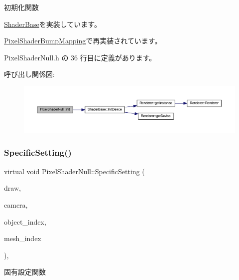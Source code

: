 初期化関数 



\mbox{\hyperlink{class_shader_base_a9622b2f5e0184a78d3af82820dc5113d}{Shader\+Base}}を実装しています。



\mbox{\hyperlink{class_pixel_shader_bump_mapping_ab7807b7c56242e965ddb23e66e1a5d9e}{Pixel\+Shader\+Bump\+Mapping}}で再実装されています。



 Pixel\+Shader\+Null.\+h の 36 行目に定義があります。

呼び出し関係図\+:
\nopagebreak
\begin{figure}[H]
\begin{center}
\leavevmode
\includegraphics[width=350pt]{class_pixel_shader_null_abfd7a6a986da09061a55d31024219eba_cgraph}
\end{center}
\end{figure}
\mbox{\label{class_pixel_shader_null_a8dd0194b5a22da5261ab35233a7cfdcd}} 
\subsubsection{\texorpdfstring{Specific\+Setting()}{SpecificSetting()}}
{\footnotesize\ttfamily virtual void Pixel\+Shader\+Null\+::\+Specific\+Setting (\begin{DoxyParamCaption}\item[{\mbox{\hyperlink{class_draw_base}{Draw\+Base}} $\ast$}]{draw,  }\item[{\mbox{\hyperlink{class_camera}{Camera}} $\ast$}]{camera,  }\item[{unsigned}]{object\+\_\+index,  }\item[{unsigned}]{mesh\+\_\+index }\end{DoxyParamCaption})\hspace{0.3cm}{\ttfamily [inline]}, {\ttfamily [virtual]}}



固有設定関数 


